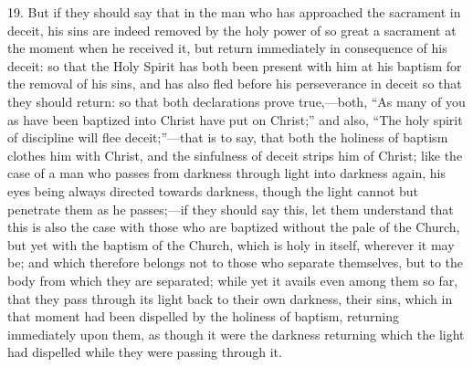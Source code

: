 19. But if they should say that in the man who has approached the sacrament in deceit, his sins are indeed removed by the holy power of so great a sacrament at the moment when he received it, but return immediately in consequence of his deceit: so that the Holy Spirit has both been present with him at his baptism for the removal of his sins, and has also fled before his perseverance in deceit so that they should return: so that both declarations prove true,—both, ``As many of you as have been baptized into Christ have put on Christ;'' and also, ``The holy spirit of discipline will flee deceit;''—that is to say, that both the holiness of baptism clothes him with Christ, and the sinfulness of deceit strips him of Christ; like the case of a man who passes from darkness through light into darkness again, his eyes being always directed towards darkness, though the light cannot but penetrate them as he passes;—if they should say this, let them understand that this is also the case with those who are baptized without the pale of the Church, but yet with the baptism of the Church, which is holy in itself, wherever it may be; and which therefore belongs not to those who separate themselves, but to the body from which they are separated; while yet it avails even among them so far, that they pass through its light back to their own darkness, their sins, which in that moment had been dispelled by the holiness of baptism, returning immediately upon them, as though it were the darkness returning which the light had dispelled while they were passing through it.


